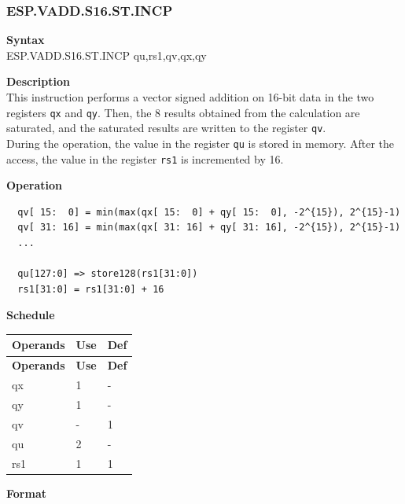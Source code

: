 \newpage
\subsubsection{ESP.VADD.S16.ST.INCP}\label{instruction:ESPVADDS16STINCP}
\textbf{Syntax}\\
ESP.VADD.S16.ST.INCP qu,rs1,qv,qx,qy

\textbf{Description}\\
This instruction performs a vector signed addition on 16-bit data in the two registers \lstinline{qx} and \lstinline{qy}. Then, the 8 results obtained from the calculation are saturated, and the saturated results are written to the register \lstinline{qv}. \\ During the operation, the value in the register \lstinline{qu} is stored in memory. After the access, the value in the register \lstinline{rs1} is incremented by 16.

\textbf{Operation}\\
\begin{lstlisting}
  qv[ 15:  0] = min(max(qx[ 15:  0] + qy[ 15:  0], -2^{15}), 2^{15}-1)
  qv[ 31: 16] = min(max(qx[ 31: 16] + qy[ 31: 16], -2^{15}), 2^{15}-1)
  ...

  qu[127:0] => store128(rs1[31:0])
  rs1[31:0] = rs1[31:0] + 16
\end{lstlisting}

\textbf{Schedule}\\
\begin{longtable}[c]{|l|l|l|}
    \hline
    \rowcolor{lightgray}
    \textbf{Operands} & \textbf{Use} & \textbf{Def} \\\hline
    \endfirsthead
    \hline
    \rowcolor{lightgray}
     \textbf{Operands} & \textbf{Use} & \textbf{Def} \\\hline
    \endhead
    \hline
    \endfoot

    qx & 1 & - \\\hline
  qy & 1 & - \\\hline
     qv & - & 1 \\\hline
     qu & 2 & - \\\hline
     rs1 & 1 & 1

\end{longtable}

\textbf{Format}\\

